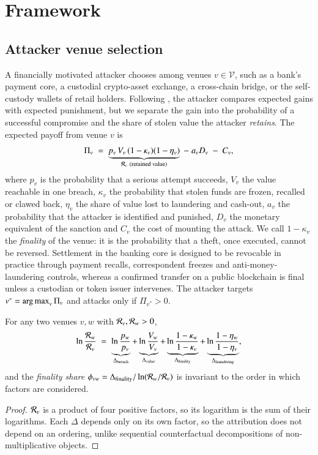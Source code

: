 \section{Framework}\label{sec:framework}

\subsection{Attacker venue selection}\label{sec:attacker}

A financially motivated attacker chooses among venues $v \in \mathcal{V}$, such as a bank's payment core, a custodial crypto-asset exchange, a cross-chain bridge, or the self-custody wallets of retail holders. Following \citet{becker1968}, the attacker compares expected gains with expected punishment, but we separate the gain into the probability of a successful compromise and the share of stolen value the attacker \emph{retains}. The expected payoff from venue $v$ is
\begin{equation}\label{eq:payoff}
\Pi_v \;=\; \underbrace{p_v\, V_v\, (1-\kappa_v)(1-\eta_v)}_{\Rv_v\ \text{(retained value)}} \;-\; a_v D_v \;-\; C_v ,
\end{equation}
where $p_v$ is the probability that a serious attempt succeeds, $V_v$ the value reachable in one breach, $\kappa_v$ the probability that stolen funds are frozen, recalled or clawed back, $\eta_v$ the share of value lost to laundering and cash-out, $a_v$ the probability that the attacker is identified and punished, $D_v$ the monetary equivalent of the sanction and $C_v$ the cost of mounting the attack. We call $1-\kappa_v$ the \emph{finality} of the venue: it is the probability that a theft, once executed, cannot be reversed. Settlement in the banking core is designed to be revocable in practice through payment recalls, correspondent freezes and anti-money-laundering controls, whereas a confirmed transfer on a public blockchain is final unless a custodian or token issuer intervenes. The attacker targets $v^\ast = \operatorname*{arg\,max}_v \Pi_v$ and attacks only if $\Pi_{v^\ast} > 0$.

\begin{proposition}\label{prop:decomp}
For any two venues $v,w$ with $\mathcal{R}_v,\mathcal{R}_w > 0$,
\begin{equation}\label{eq:decomp}
\ln\frac{\mathcal{R}_w}{\mathcal{R}_v} \;=\; \underbrace{\ln\frac{p_w}{p_v}}_{\Delta_{\text{breach}}} + \underbrace{\ln\frac{V_w}{V_v}}_{\Delta_{\text{value}}} + \underbrace{\ln\frac{1-\kappa_w}{1-\kappa_v}}_{\Delta_{\text{finality}}} + \underbrace{\ln\frac{1-\eta_w}{1-\eta_v}}_{\Delta_{\text{laundering}}} ,
\end{equation}
and the \emph{finality share} $\phi_{vw} = \Delta_{\text{finality}}/\ln(\mathcal{R}_w/\mathcal{R}_v)$ is invariant to the order in which factors are considered.
\end{proposition}
\begin{proof}
$\mathcal{R}_v$ is a product of four positive factors, so its logarithm is the sum of their logarithms. Each $\Delta$ depends only on its own factor, so the attribution does not depend on an ordering, unlike sequential counterfactual decompositions of non-multiplicative objects.
\end{proof}

